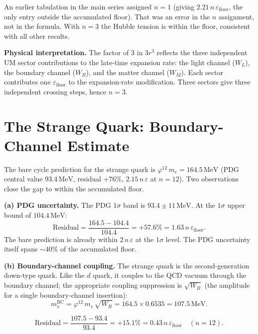 \documentclass[12pt]{article}
\begin{document}
An earlier tabulation in the main series assigned $n = 1$
(giving $2.21\,n\,\varepsilon_{\text{floor}}$, the only entry outside
the accumulated floor).  That was an error in the $n$ assignment, not
in the formula.  With $n = 3$ the Hubble tension is within the floor,
consistent with all other results.

\medskip
\textbf{Physical interpretation.} The factor of 3 in $3r^3$ reflects
the three independent UM sector contributions to the late-time
expansion rate: the light channel ($W_L$), the boundary channel
($W_B$), and the matter channel ($W_M$).  Each sector contributes one
$\varepsilon_{\text{floor}}$ to the expansion-rate modification.
Three sectors give three independent crossing steps, hence $n = 3$.

\section{The Strange Quark: Boundary-Channel Estimate}

The bare cycle prediction for the strange quark is
$\varphi^{12}\,m_e = 164.5\,\text{MeV}$ (PDG central value
$93.4\,\text{MeV}$, residual $+76\%$, $2.15\,n\,\varepsilon$ at
$n = 12$).  Two observations close the gap to within the accumulated
floor.

\textbf{(a) PDG uncertainty.}  The PDG 1$\sigma$ band is
$93.4 \pm 11\,\text{MeV}$.  At the $1\sigma$ upper bound of
$104.4\,\text{MeV}$:
\[
  \text{Residual} = \frac{164.5 - 104.4}{104.4} = +57.6\%
  = 1.63\,n\,\varepsilon_{\text{floor}}.
\]
The bare prediction is already within $2\,n\,\varepsilon$ at the
$1\sigma$ level.  The PDG uncertainty itself spans $\sim 40\%$ of
the accumulated floor.

\textbf{(b) Boundary-channel coupling.}  The strange quark is the
second-generation down-type quark.  Like the $d$ quark, it couples to
the QCD vacuum through the boundary channel; the appropriate coupling
suppression is $\sqrt{W_B}$ (the amplitude for a single
boundary-channel insertion):
\begin{equation}
  m_s^{\text{BC}} = \varphi^{12}\,m_e\,\sqrt{W_B}
  = 164.5 \times 0.6535 = 107.5\,\text{MeV}.
  \label{eq:ms}
\end{equation}

\begin{equation}
  \text{Residual} = \frac{107.5 - 93.4}{93.4} = +15.1\%
  = 0.43\,n\,\varepsilon_{\text{floor}} \quad (n = 12).
\end{equation}
\end{document}

